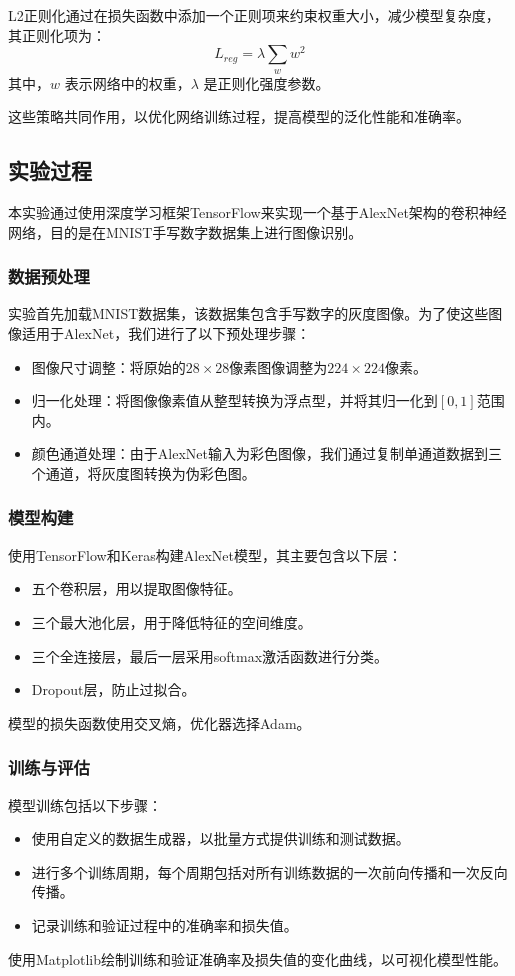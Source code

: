 \documentclass[a4paper,12pt]{article}
\begin{document}
L2正则化通过在损失函数中添加一个正则项来约束权重大小，减少模型复杂度，其正则化项为：
\begin{equation}
	L_{reg} = \lambda \sum_{w} w^2
\end{equation}
其中，$w$ 表示网络中的权重，$\lambda$ 是正则化强度参数。

这些策略共同作用，以优化网络训练过程，提高模型的泛化性能和准确率。
\subsection{实验过程}
本实验通过使用深度学习框架TensorFlow来实现一个基于AlexNet架构的卷积神经网络，目的是在MNIST手写数字数据集上进行图像识别。

\subsubsection{数据预处理}
实验首先加载MNIST数据集，该数据集包含手写数字的灰度图像。为了使这些图像适用于AlexNet，我们进行了以下预处理步骤：
\begin{itemize}
	\item 图像尺寸调整：将原始的$28 \times 28$像素图像调整为$224 \times 224$像素。
	\item 归一化处理：将图像像素值从整型转换为浮点型，并将其归一化到$[0, 1]$范围内。
	\item 颜色通道处理：由于AlexNet输入为彩色图像，我们通过复制单通道数据到三个通道，将灰度图转换为伪彩色图。
\end{itemize}

\subsubsection{模型构建}
使用TensorFlow和Keras构建AlexNet模型，其主要包含以下层：
\begin{itemize}
	\item 五个卷积层，用以提取图像特征。
	\item 三个最大池化层，用于降低特征的空间维度。
	\item 三个全连接层，最后一层采用softmax激活函数进行分类。
	\item Dropout层，防止过拟合。
\end{itemize}
模型的损失函数使用交叉熵，优化器选择Adam。

\subsubsection{训练与评估}
模型训练包括以下步骤：
\begin{itemize}
	\item 使用自定义的数据生成器，以批量方式提供训练和测试数据。
	\item 进行多个训练周期，每个周期包括对所有训练数据的一次前向传播和一次反向传播。
	\item 记录训练和验证过程中的准确率和损失值。
\end{itemize}
使用Matplotlib绘制训练和验证准确率及损失值的变化曲线，以可视化模型性能。
\end{document}
